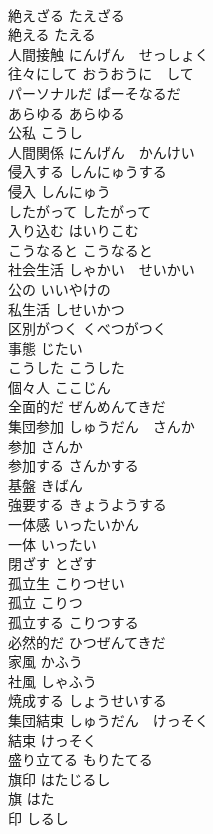 \documentclass[8pt]{extreport}
\begin{document}
\begin{CJK}{UTF8}{min}
\\	絶えざる	たえざる	
\\	絶える	たえる	
\\	人間接触	にんげん　せっしょく	
\\	往々にして	おうおうに　して	
\\	パーソナルだ	ぱーそなるだ	
\\	あらゆる	あらゆる	
\\	公私	こうし	
\\	人間関係	にんげん　かんけい	
\\	侵入する	しんにゅうする	
\\	侵入	しんにゅう	
\\	したがって	したがって	
\\	入り込む	はいりこむ	
\\	こうなると	こうなると	
\\	社会生活	しゃかい　せいかい	
\\	公の	いいやけの	
\\	私生活	しせいかつ	
\\	区別がつく	くべつがつく	
\\	事態	じたい	
\\	こうした	こうした	
\\	個々人	ここじん	
\\	全面的だ	ぜんめんてきだ	
\\	集団参加	しゅうだん　さんか	
\\	参加	さんか	
\\	参加する	さんかする	
\\	基盤	きばん	
\\	強要する	きょうようする	
\\	一体感	いったいかん	
\\	一体	いったい	
\\	閉ざす	とざす	
\\	孤立生	こりつせい	
\\	孤立	こりつ	
\\	孤立する	こりつする	
\\	必然的だ	ひつぜんてきだ	
\\	家風	かふう	
\\	社風	しゃふう	
\\	焼成する	しょうせいする	
\\	集団結束	しゅうだん　けっそく	
\\	結束	けっそく	
\\	盛り立てる	もりたてる	
\\	旗印	はたじるし	
\\	旗	はた	
\\	印	しるし	

\end{CJK}
\end{document}
